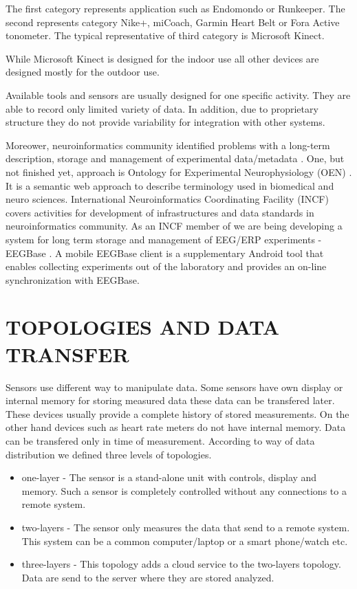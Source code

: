 \documentclass[a4paper,twoside]{article}
\begin{document}
The first category represents application such as Endomondo or Runkeeper. The second represents category Nike+, miCoach, Garmin Heart Belt or Fora Active tonometer. The typical representative of third category is Microsoft Kinect.

While Microsoft Kinect is designed for the indoor use all other devices are designed mostly for the outdoor use. 

Available tools and sensors are usually designed for one specific activity. They are able to record only limited variety of data. In addition, due to proprietary structure they do not provide variability for integration with other systems. 

Moreower, neuroinformatics community identified problems with a long-term description, storage and management of experimental data/metadata \cite{CRCNS}. One, but not finished yet, approach is Ontology for Experimental Neurophysiology (OEN) \cite{10.3389/conf.fninf.2014.18.00044}. It is a semantic web approach to describe terminology used in biomedical and neuro sciences. International Neuroinformatics Coordinating Facility (INCF) \cite{INCF} covers activities for development of infrastructures and data standards in neuroinformatics community. As an INCF member of we are being developing a system for long term storage and management of EEG/ERP experiments - EEGBase \cite{ISI:000306821100004}. A mobile EEGBase client \cite{10.3389/conf.fninf.2013.09.00046} is a supplementary Android tool that enables collecting experiments out of the laboratory and provides an on-line synchronization with EEGBase.


\section{\uppercase{Topologies and Data Transfer}}
\label{topology_data_transfer}

\noindent 
Sensors use different way to manipulate data. Some sensors have own display or internal memory for storing measured data these data can be transfered later. These devices usually provide a complete history of stored measurements. On the other hand devices such as heart rate meters do not have internal memory. Data can be transfered only in time of measurement. According to way of data distribution we defined three levels of topologies.

\begin{itemize}
 \item one-layer - The sensor is a stand-alone unit with controls, display and memory. Such a sensor is completely controlled without any connections to a remote system.   
 \item two-layers - The sensor only measures the data that send to a remote system. This system can be a common computer/laptop or a smart phone/watch etc. 
 \item three-layers - This topology adds a cloud service to the two-layers topology. Data are send to the server where they are stored analyzed. 
\end{itemize}
\end{document}
